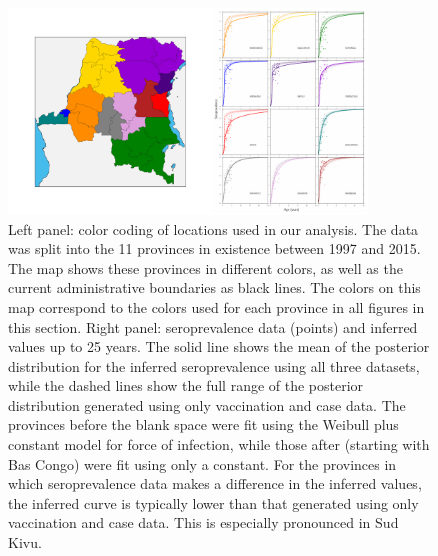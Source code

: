 \documentclass[nofootinbib,aps,pre,twocolumn,superscriptaddress,showkeys,showpacs]{revtex4-1}
\begin{document}
\begin{figure}
\includegraphics[width=0.85\textwidth,angle=0]{figures/SeroPlots-crop.pdf}
\caption{\label{fig:sero} Left panel: color coding of locations used in our analysis. The data was split into the 11 provinces in existence between 1997 and 2015. The map shows these provinces in different colors, as well as the current administrative boundaries as black lines. The colors on this map correspond to the colors used for each province in all figures in this section. Right panel: seroprevalence data (points) and inferred values up to 25 years. The solid line shows the mean of the posterior distribution for the inferred seroprevalence using all three datasets, while the dashed lines show the full range of the posterior distribution generated using only vaccination and case data. The provinces before the blank space were fit using the Weibull plus constant model for force of infection, while those after (starting with Bas Congo) were fit using only a constant. For the provinces in which seroprevalence data makes a difference in the inferred values, the inferred curve is typically lower than that generated using only vaccination and case data. This is especially pronounced in Sud Kivu.}
\end{figure}
\end{document}
